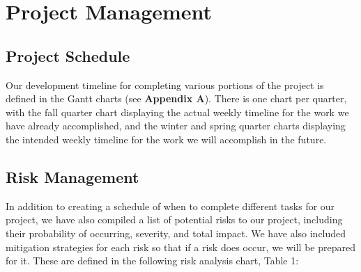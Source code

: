 \chapter{Project Management}

\section{Project Schedule}
Our development timeline for completing various portions of the project is defined in the Gantt charts (see \textbf{Appendix A}). There is one chart per quarter, with the fall quarter chart displaying the actual weekly timeline for the work we have already accomplished, and the winter and spring quarter charts displaying the intended weekly timeline for the work we will accomplish in the future.

\section{Risk Management}
In addition to creating a schedule of when to complete different tasks for our project, we have also compiled a list of potential risks to our project, including their probability of occurring, severity, and total impact. We have also included mitigation strategies for each risk so that if a risk does occur, we will be prepared for it. These are defined in the following risk analysis chart, Table 1:
